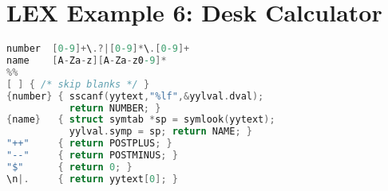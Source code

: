 \documentclass[12pt,a4paper]{article}
\begin{document}
\section*{LEX Example 6: Desk Calculator}
\begin{lstlisting}[language=C]
number  [0-9]+\.?|[0-9]*\.[0-9]+
name    [A-Za-z][A-Za-z0-9]*
%%
[ ] { /* skip blanks */ }
{number} { sscanf(yytext,"%lf",&yylval.dval);
           return NUMBER; }
{name}   { struct symtab *sp = symlook(yytext);
           yylval.symp = sp; return NAME; }
"++"     { return POSTPLUS; }
"--"     { return POSTMINUS; }
"$"      { return 0; }
\n|.     { return yytext[0]; }
\end{lstlisting}
\end{document}
